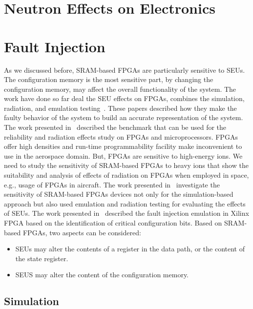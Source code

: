 \section{Neutron Effects on Electronics}

\section{Fault Injection}

As we discussed before, SRAM-based FPGAs are particularly sensitive to SEUs. The configuration memory is the most sensitive part, by changing the configuration memory, may affect the overall functionality of the system. The work have done so far deal the SEU effects on FPGAs, combines the simulation, radiation, and emulation testing~\cite{quinn2015validation, violante2004simulation, hobeika2014multi, robache2013methodology, quinn2015using, souari2015optimization}. These papers described how they make the faulty behavior of the system to build an accurate representation of the system. The work presented in~\cite{quinn2015using} described the benchmark that can be used for the reliability and radiation effects study on FPGAs and microprocessors. FPGAs offer high densities and run-time programmability facility make inconvenient to use in the aerospace domain. But, FPGAs are sensitive to high-energy ions.  We need to study the sensitivity of SRAM-based FPGAs to heavy ions that show the suitability and analysis of effects of radiation on FPGAs when employed in space, e.g., usage of FPGAs in aircraft. The work presented in~\cite{hobeika2014multi} investigate the sensitivity of SRAM-based FPGAs devices not only for the simulation-based approach but also used emulation and radiation testing for evaluating the effects of SEUs. The work presented in~\cite{souari2015optimization} described the fault injection emulation in Xilinx FPGA based on the identification of critical configuration bits. Based on SRAM-based FPGAs, two aspects can be considered:

\begin{itemize}


\item SEUs may alter the contents of a register in the data path, or the content of the state register.
\item SEUS may alter the content of the configuration memory.

\end{itemize}



\subsection{Simulation}

